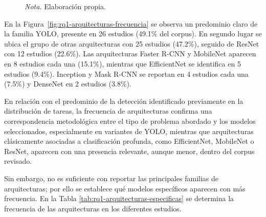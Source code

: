 \begin{figure}[H]
    \vspace{-0.20 cm}
    \begin{flushleft}
    \normalfont\normalsize\textit{Nota.} Elaboración propia.
    \end{flushleft}
\end{figure}

\vspace{-1.0 cm}
En la Figura~\ref{fig:rq1-arquitecturas-frecuencia} se observa un predominio claro de la familia YOLO, presente en 26 estudios (49.1\% del corpus). En segundo lugar se ubica el grupo de otras arquitecturas con 25 estudios (47.2\%), seguido de ResNet con 12 estudios (22.6\%). Las arquitecturas Faster R-CNN y MobileNet aparecen en 8 estudios cada una (15.1\%), mientras que EfficientNet se identifica en 5 estudios (9.4\%). Inception y Mask R-CNN se reportan en 4 estudios cada una (7.5\%) y DenseNet en 2 estudios (3.8\%).

En relación con el predominio de la detección identificado previamente en la distribución de tareas, la frecuencia de arquitecturas confirma una correspondencia metodológica entre el tipo de problema abordado y los modelos seleccionados, especialmente en variantes de YOLO, mientras que arquitecturas clásicamente asociadas a clasificación profunda, como EfficientNet, MobileNet o ResNet, aparecen con una presencia relevante, aunque menor, dentro del corpus revisado.

Sin embargo, no es suficiente con reportar las principales familias de arquitecturas; por ello se establece qué modelos específicos aparecen con más frecuencia. En la Tabla \ref{tab:rq1-arquitecturas-especificas} se determina la frecuencia de las arquitecturas en los diferentes estudios. \\

